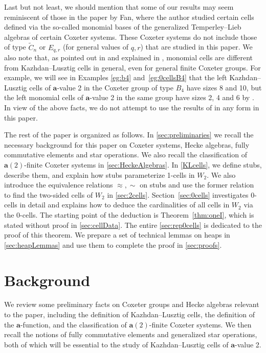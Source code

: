 \documentclass[ALCO,Unicode,published]{cedram}
\newcommand{\la}{\mathbf{a}}
\begin{document}
Last but not least, we should mention that some of our results may seem reminiscent of those in the
paper \cite{FanStructure} by Fan, where the author studied certain cells defined via the so-called
{monomial bases} of the {generalized Temperley--Lieb algebras} of certain Coxeter systems.  These
Coxeter systems do not include those of type $\tilde C_n$ or $E_{q,r}$ (for general values of $q,r$)
that are studied in this paper. We also note that, as pointed out in \cite[\S 4.1]{FanStructure} and
explained in \cite{BremkeFan, GreenLosonczy, GL}, monomial cells are different from Kazhdan--Lusztig
cells in general, even for general finite Coxeter groups. For example, we will see in Examples
\ref{eg:b4} and~\ref{eg:0cellsB4} that the left Kazhdan--Lusztig cells of $\la$-value 2 in the
Coxeter group of type $B_4$ have sizes 8 and 10, but the left monomial cells of $\la$-value 2 in the
same group have sizes 2, 4 and 6 by \cite[\S 7.1]{FanStructure}. In view of the above facts, we do
not attempt to use the results of \cite{FanStructure} in any form in this paper. 

The rest of the paper is organized as follows. In \autoref{sec:preliminaries} we recall the necessary
background for this paper on Coxeter systems, Hecke algebras, fully commutative elements and star
operations. We also recall the classification of $\la(2)$-finite Coxeter systems in
\autoref{sec:HeckeAlgebras}. In \autoref{KLcells}, we define stubs, describe them, and explain how
stubs parameterize 1-cells in $W_2$. We also introduce the equivalence relations $\approx, \sim$ on
stubs and use the former relation to find the two-sided cells of $W_2$ in \autoref{sec:2cells}.
Section~\ref{sec:0cells} investigates 0-cells in detail and explains how to deduce the cardinalities of all
cells in $W_2$ via the 0-cells. The starting point of the deduction is Theorem~\ref{thm:oneI}, which is
stated without proof in \autoref{sec:cellData}. The entire \autoref{sec:rep0cells} is dedicated to the
proof of this theorem. We prepare a set of technical lemmas on heaps in \autoref{sec:heapLemmas} and
use them to complete the proof in \autoref{sec:proofs}.


\section{Background}
\label{sec:preliminaries}

We review some preliminary facts on Coxeter groups and Hecke algebras relevant to the paper,
including the definition of Kazhdan--Lusztig cells, the definition of the $\la$-function, and the
classification of $\la(2)$-finite Coxeter systems. We then recall the notions of fully commutative
elements and generalized star operations, both of which will be essential to the study of
Kazhdan--Lusztig cells of $\la$-value 2.  
\end{document}
